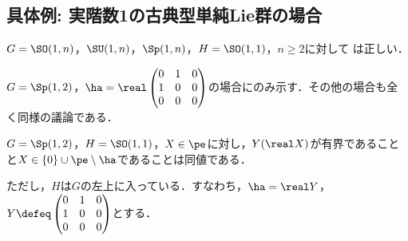 \subsection{具体例: 実階数1の古典型単純Lie群の場合}
\begin{prop}\label{prop:classical-rank-one}
  $G = \SO(1,n)$，$ \SU(1, n)$，$\Sp(1,n) $，$H = \SO(1,1) $，$n\geq 2$に対して は正しい．
\end{prop}

$G = \Sp(1,2) $，$\ha = \real \begin{pmatrix}
    0 & 1 & 0 \\
    1 & 0 & 0\\
    0 & 0 & 0
  \end{pmatrix}$の場合にのみ示す．その他の場合も全く同様の議論である．
\begin{prop}\label{prop:1127-main}
  $G = \Sp(1,2) $，$H = \SO(1,1)$，$X\in \pe$に対し，$Y(\real X) $が有界であることと$ X\in \{0\}\cup \pe\setminus \ha  $であることは同値である．
\end{prop}

ただし，$H$は$G$の左上に入っている．すなわち，$\ha = \real Y $，$Y\defeq \begin{pmatrix}
  0 & 1 & 0 \\
  1 & 0 & 0\\
  0 & 0 & 0
\end{pmatrix}$とする．

